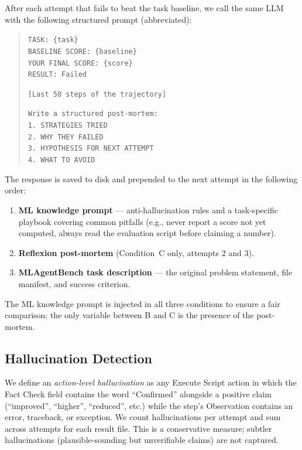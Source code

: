 \documentclass[conference]{IEEEtran}
\begin{document}
After each attempt that fails to beat the task baseline, we call the same LLM
with the following structured prompt (abbreviated):

\begin{quote}
\small
\texttt{TASK: \{task\}\\
BASELINE SCORE: \{baseline\}\\
YOUR FINAL SCORE: \{score\}\\
RESULT: Failed}

\texttt{[Last 50 steps of the trajectory]}

\texttt{Write a structured post-mortem:\\
1. STRATEGIES TRIED\\
2. WHY THEY FAILED\\
3. HYPOTHESIS FOR NEXT ATTEMPT\\
4. WHAT TO AVOID}
\end{quote}

The response is saved to disk and prepended to the next attempt in the
following order:

\begin{enumerate}
  \item \textbf{ML knowledge prompt} --- anti-hallucination rules and a
        task-specific playbook covering common pitfalls (e.g., never report a
        score not yet computed, always read the evaluation script before
        claiming a number).
  \item \textbf{Reflexion post-mortem} (Condition~C only, attempts 2 and 3).
  \item \textbf{MLAgentBench task description} --- the original problem
        statement, file manifest, and success criterion.
\end{enumerate}

The ML knowledge prompt is injected in all three conditions to ensure a fair
comparison; the only variable between B and C is the presence of the post-mortem.

\subsection{Hallucination Detection}

We define an \emph{action-level hallucination} as any Execute Script action
in which the Fact Check field contains the word ``Confirmed'' alongside a
positive claim (``improved'', ``higher'', ``reduced'', etc.) while the step's
Observation contains an error, traceback, or exception. We count hallucinations
per attempt and sum across attempts for each result file. This is a conservative
measure; subtler hallucinations (plausible-sounding but unverifiable claims) are
not captured.
\end{document}
